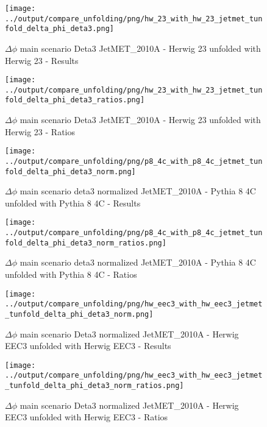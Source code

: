\documentclass[11pt]{book}
\begin{document}
\begin{figure}[ht]
\centering
\texttt{[image: ../output/compare\_unfolding/png/hw\_23\_with\_hw\_23\_jetmet\_tunfold\_delta\_phi\_deta3.png]}
\caption{$\Delta\phi$ main scenario Deta3 JetMET\_2010A - Herwig 23 unfolded with Herwig 23 - Results}
\label{hw_23_hw_23_jetmet_tunfold_delta_phi_deta3_a}
\end{figure}

\begin{figure}[ht]
\centering
\texttt{[image: ../output/compare\_unfolding/png/hw\_23\_with\_hw\_23\_jetmet\_tunfold\_delta\_phi\_deta3\_ratios.png]}
\caption{$\Delta\phi$ main scenario Deta3 JetMET\_2010A - Herwig 23 unfolded with Herwig 23 - Ratios}
\label{hw_23_hw_23_jetmet_tunfold_delta_phi_deta3_b}
\end{figure}


\begin{figure}[ht]
\centering
\texttt{[image: ../output/compare\_unfolding/png/p8\_4c\_with\_p8\_4c\_jetmet\_tunfold\_delta\_phi\_deta3\_norm.png]}
\caption{$\Delta\phi$ main scenario deta3 normalized JetMET\_2010A - Pythia 8 4C unfolded with Pythia 8 4C - Results}
\label{p8_p8_jetmet_tunfold_delta_phi_deta3_norm_a}
\end{figure}

\begin{figure}[ht]
\centering
\texttt{[image: ../output/compare\_unfolding/png/p8\_4c\_with\_p8\_4c\_jetmet\_tunfold\_delta\_phi\_deta3\_norm\_ratios.png]}
\caption{$\Delta\phi$ main scenario deta3 normalized JetMET\_2010A - Pythia 8 4C unfolded with Pythia 8 4C - Ratios}
\label{p8_p8_jetmet_tunfold_delta_phi_deta3_norm_b}
\end{figure}

\begin{figure}[ht]
\centering
\texttt{[image: ../output/compare\_unfolding/png/hw\_eec3\_with\_hw\_eec3\_jetmet\_tunfold\_delta\_phi\_deta3\_norm.png]}
\caption{$\Delta\phi$ main scenario Deta3 normalized JetMET\_2010A - Herwig EEC3 unfolded with Herwig EEC3 - Results}
\label{hw_eec3_hw_eec3_jetmet_tunfold_delta_phi_deta3_norm_a}
\end{figure}

\begin{figure}[ht]
\centering
\texttt{[image: ../output/compare\_unfolding/png/hw\_eec3\_with\_hw\_eec3\_jetmet\_tunfold\_delta\_phi\_deta3\_norm\_ratios.png]}
\caption{$\Delta\phi$ main scenario Deta3 normalized JetMET\_2010A - Herwig EEC3 unfolded with Herwig EEC3 - Ratios}
\label{hw_eec3_hw_eec3_jetmet_tunfold_delta_phi_deta3_norm_b}
\end{figure}
\end{document}
